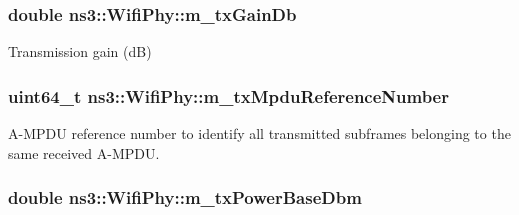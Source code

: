 \subsubsection[{\texorpdfstring{m\+\_\+tx\+Gain\+Db}{m_txGainDb}}]{\setlength{\rightskip}{0pt plus 5cm}double ns3\+::\+Wifi\+Phy\+::m\+\_\+tx\+Gain\+Db\hspace{0.3cm}{\ttfamily [private]}}\hypertarget{classns3_1_1WifiPhy_a9da4312858797f77c3c08e3d9623c2d0}{}\label{classns3_1_1WifiPhy_a9da4312858797f77c3c08e3d9623c2d0}


Transmission gain (dB) 

\subsubsection[{\texorpdfstring{m\+\_\+tx\+Mpdu\+Reference\+Number}{m_txMpduReferenceNumber}}]{\setlength{\rightskip}{0pt plus 5cm}uint64\+\_\+t ns3\+::\+Wifi\+Phy\+::m\+\_\+tx\+Mpdu\+Reference\+Number\hspace{0.3cm}{\ttfamily [protected]}}\hypertarget{classns3_1_1WifiPhy_a65b97f34265cf958696286ddbd0fcb17}{}\label{classns3_1_1WifiPhy_a65b97f34265cf958696286ddbd0fcb17}


A-\/\+M\+P\+DU reference number to identify all transmitted subframes belonging to the same received A-\/\+M\+P\+DU. 

\subsubsection[{\texorpdfstring{m\+\_\+tx\+Power\+Base\+Dbm}{m_txPowerBaseDbm}}]{\setlength{\rightskip}{0pt plus 5cm}double ns3\+::\+Wifi\+Phy\+::m\+\_\+tx\+Power\+Base\+Dbm\hspace{0.3cm}{\ttfamily [private]}}\hypertarget{classns3_1_1WifiPhy_a2c13c9ac534ed778bd9600b6ff988e87}{}\label{classns3_1_1WifiPhy_a2c13c9ac534ed778bd9600b6ff988e87}



